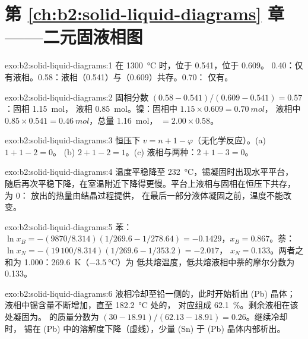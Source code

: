 \section*{第 \ref{ch:b2:solid-liquid-diagrams} 章——二元固液相图}

\begin{solution}{exo:b2:solid-liquid-diagrams:1}
在 \qty{1300}{\degreeCelsius} 时，位于 0.541，位于 0.609。
0.40：仅有液相。0.58：液相（0.541）与（0.609）共存。0.70：
仅有。
\end{solution}

\begin{solution}{exo:b2:solid-liquid-diagrams:2}
固相分数 $(0.58 - 0.541)/(0.609 - 0.541) = 0.57$：固相 \qty{1.15}{mol}，
液相 \qty{0.85}{mol}。镍：固相中 $1.15 \times 0.609 = \qty{0.70}{mol}$，
液相中 $0.85 \times 0.541 = \qty{0.46}{mol}$，总量 \qty{1.16}{mol}，
$= 2.00 \times 0.58$。
\end{solution}

\begin{solution}{exo:b2:solid-liquid-diagrams:3}
恒压下 $v = n + 1 - \varphi$（无化学反应）。(a) $1 + 1 - 2 = 0$。
(b) $2 + 1 - 2 = 1$。(c) 液相与两种：$2 + 1 - 3 = 0$。
\end{solution}

\begin{solution}{exo:b2:solid-liquid-diagrams:4}
温度平稳降至 \qty{232}{\degreeCelsius}，锡凝固时出现水平平台，
随后再次平稳下降，在室温附近下降得更慢。平台上液相与固相在恒压下共存，
为 0：
放出的热量由结晶过程提供，
在最后一部分液体凝固之前，温度不能改变。
\end{solution}

\begin{solution}{exo:b2:solid-liquid-diagrams:5}
苯：$\ln x_B = -(9870/8.314)(1/269.6 - 1/278.64) = -0.1429$，$x_B =
0.867$。萘：$\ln x_N = -(19\,100/8.314)(1/269.6 - 1/353.2) = -2.017$，
$x_N = 0.133$。两者之和为 1.000：\qty{269.6}{K}（$\qty{-3.5}{\degreeCelsius}$）为
低共熔温度，低共熔液相中萘的摩尔分数为 0.133。
\end{solution}

\begin{solution}{exo:b2:solid-liquid-diagrams:6}
液相冷却至铅一侧的，此时开始析出 (Pb) 晶体；
液相中锡含量不断增加，直至 \qty{182.2}{\degreeCelsius} 处的，
对应组成 62.1~\%。剩余液相在该处凝固为。
的质量分数为 $(30 - 18.91)/(62.13 - 18.91) = 0.26$。继续冷却时，
锡在 (Pb) 中的溶解度下降（虚线），少量 (Sn)
于 (Pb) 晶体内部析出。
\end{solution}

